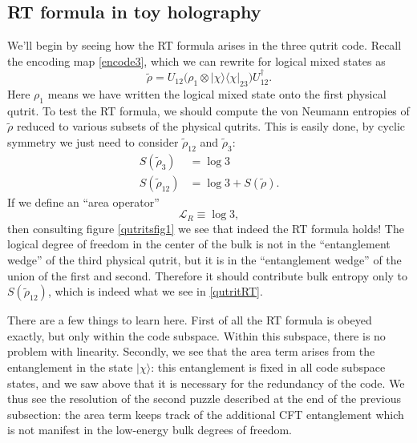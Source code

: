 \documentclass[toc]{PoS}
\newcommand{\be}{\begin{equation}}
\newcommand{\ee}{\end{equation}}
\newcommand{\lan}{\langle}
\newcommand{\ran}{\rangle}
\newcommand{\wt}{\widetilde}
\newcommand{\LR}{\mathcal{L}_R}
\begin{document}
\subsection{RT formula in toy holography}\label{RTcode}
We'll begin by seeing how the RT formula arises in the three qutrit code.  Recall the encoding map \eqref{encode3}, which we can rewrite for logical mixed states as
\be
\wt{\rho}=U_{12}\Big(\rho_1 \otimes |\chi\ran\lan\chi|_{23}\Big)U_{12}^\dagger.
\ee
Here $\rho_1$ means we have written the logical mixed state onto the first physical qutrit. To test the RT formula, we should compute the von Neumann entropies of $\wt{\rho}$ reduced to various subsets of the physical qutrits.  This is easily done, by cyclic symmetry we just need to consider $\wt{\rho}_{12}$ and $\wt{\rho}_3$:
\begin{align}\nonumber
S\left(\wt{\rho}_3\right)&=\log 3\\
S\left(\wt{\rho}_{12}\right)&=\log 3+S\left(\wt{\rho}\right).\label{qutritRT}
\end{align}
If we define an ``area operator''
\be\label{LR1}
\LR\equiv \log 3,
\ee
then consulting figure \ref{qutritsfig1} we see that indeed the RT formula holds!  The logical degree of freedom in the center of the bulk is not in the ``entanglement wedge'' of the third physical qutrit, but it is in the ``entanglement wedge'' of the union of the first and second.  Therefore it should contribute bulk entropy only to $S(\wt{\rho}_{12})$, which is indeed what we see in \eqref{qutritRT}.

There are a few things to learn here.  First of all the RT formula is obeyed exactly, but only within the code subspace.  Within this subspace, there is no problem with linearity.  Secondly, we see that the area term arises from the entanglement in the state $|\chi\ran$: this entanglement is fixed in all code subspace states,  and we saw above that it is necessary for the redundancy of the code.  We thus see the resolution of the second puzzle described at the end of the previous subsection: the area term keeps track of the additional CFT entanglement which is not manifest in the low-energy bulk degrees of freedom.   
\end{document}
